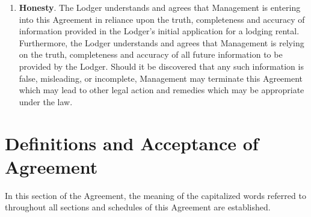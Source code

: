 \documentclass[]{article}
\newcommand{\definitions}{Definitions and Acceptance of Agreement}
\newcommand{\management}{Management}
\begin{document}
\begin{enumerate}
		\item \textbf{Honesty}.
			The Lodger understands and agrees that \management{} is entering into this Agreement in reliance upon the truth, completeness and accuracy of information provided in the Lodger's initial application for a lodging rental. Furthermore, the Lodger understands and agrees that \management{} is relying on the truth, completeness and accuracy of all future information to be provided by the Lodger. Should it be discovered that any such information is false, misleading, or incomplete, \management{} may terminate this Agreement which may lead to other legal action and remedies which may be appropriate under the law. 

	\end{enumerate}

	\section{\definitions{}} \label{definitions}
In this section of the Agreement, the meaning of the capitalized words referred to throughout all sections and schedules of this Agreement are established.
\end{document}
